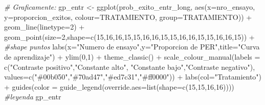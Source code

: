 \documentclass[
]{article}
\newenvironment{Shaded}{\begin{snugshade}}{\end{snugshade}}
\newcommand{\AttributeTok}[1]{\textcolor[rgb]{0.77,0.63,0.00}{#1}}
\newcommand{\CommentTok}[1]{\textcolor[rgb]{0.56,0.35,0.01}{\textit{#1}}}
\newcommand{\DecValTok}[1]{\textcolor[rgb]{0.00,0.00,0.81}{#1}}
\newcommand{\FunctionTok}[1]{\textcolor[rgb]{0.00,0.00,0.00}{#1}}
\newcommand{\NormalTok}[1]{#1}
\newcommand{\OtherTok}[1]{\textcolor[rgb]{0.56,0.35,0.01}{#1}}
\newcommand{\SpecialCharTok}[1]{\textcolor[rgb]{0.00,0.00,0.00}{#1}}
\newcommand{\StringTok}[1]{\textcolor[rgb]{0.31,0.60,0.02}{#1}}
\begin{document}
\begin{Shaded}
\begin{Highlighting}[]
\CommentTok{\# Graficamente:}
\NormalTok{gp\_entr }\OtherTok{\textless{}{-}} \FunctionTok{ggplot}\NormalTok{(prob\_exito\_entr\_long, }\FunctionTok{aes}\NormalTok{(}\AttributeTok{x=}\NormalTok{nro\_ensayo, }\AttributeTok{y=}\NormalTok{proporcion\_exitos, }\AttributeTok{colour=}\NormalTok{TRATAMIENTO, }\AttributeTok{group=}\NormalTok{TRATAMIENTO)) }\SpecialCharTok{+}
  \FunctionTok{geom\_line}\NormalTok{(}\AttributeTok{linetype=}\DecValTok{2}\NormalTok{) }\SpecialCharTok{+}
  \FunctionTok{geom\_point}\NormalTok{(}\AttributeTok{size=}\DecValTok{2}\NormalTok{,}\AttributeTok{shape=}\FunctionTok{c}\NormalTok{(}\DecValTok{15}\NormalTok{,}\DecValTok{16}\NormalTok{,}\DecValTok{16}\NormalTok{,}\DecValTok{15}\NormalTok{,}\DecValTok{15}\NormalTok{,}\DecValTok{16}\NormalTok{,}\DecValTok{16}\NormalTok{,}\DecValTok{15}\NormalTok{,}\DecValTok{15}\NormalTok{,}\DecValTok{16}\NormalTok{,}\DecValTok{16}\NormalTok{,}\DecValTok{15}\NormalTok{,}\DecValTok{15}\NormalTok{,}\DecValTok{16}\NormalTok{,}\DecValTok{16}\NormalTok{,}\DecValTok{15}\NormalTok{)) }\SpecialCharTok{+} 
  \CommentTok{\#shape puntos}
  \FunctionTok{labs}\NormalTok{(}\AttributeTok{x=}\StringTok{"Numero de ensayo"}\NormalTok{,}\AttributeTok{y=}\StringTok{"Proporcion de PER"}\NormalTok{,}\AttributeTok{title=}\StringTok{"Curva de aprendizaje"}\NormalTok{) }\SpecialCharTok{+}
  \FunctionTok{ylim}\NormalTok{(}\DecValTok{0}\NormalTok{,}\DecValTok{1}\NormalTok{) }\SpecialCharTok{+} \FunctionTok{theme\_classic}\NormalTok{() }\SpecialCharTok{+}
  \FunctionTok{scale\_colour\_manual}\NormalTok{(}\AttributeTok{labels =} \FunctionTok{c}\NormalTok{(}\StringTok{"Contraste positivo"}\NormalTok{,}\StringTok{"Constante alto"}\NormalTok{,}
                                 \StringTok{"Constante bajo"}\NormalTok{,}\StringTok{"Contraste negativo"}\NormalTok{),}
                      \AttributeTok{values=}\FunctionTok{c}\NormalTok{(}\StringTok{"\#00b050"}\NormalTok{,}\StringTok{"\#70ad47"}\NormalTok{,}\StringTok{"\#ed7c31"}\NormalTok{,}\StringTok{"\#ff0000"}\NormalTok{)) }\SpecialCharTok{+}
  \FunctionTok{labs}\NormalTok{(}\AttributeTok{col=}\StringTok{"Tratamiento"}\NormalTok{) }\SpecialCharTok{+}
  \FunctionTok{guides}\NormalTok{(}\AttributeTok{color =} \FunctionTok{guide\_legend}\NormalTok{(}\AttributeTok{override.aes=}\FunctionTok{list}\NormalTok{(}\AttributeTok{shape=}\FunctionTok{c}\NormalTok{(}\DecValTok{15}\NormalTok{,}\DecValTok{15}\NormalTok{,}\DecValTok{16}\NormalTok{,}\DecValTok{16}\NormalTok{)))) }\CommentTok{\#leyenda}
\NormalTok{gp\_entr}
\end{Highlighting}
\end{Shaded}
\end{document}
